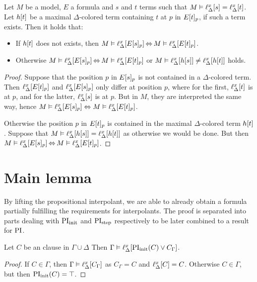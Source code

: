 \begin{lemma}
	\label{aga5tg5ba}
	Let $M$ be a model, $E$ a formula and $s$ and $t$ terms such that
	$M \vDash \ell_{\Delta}^{x}[s] = \ell_{\Delta}^{x}[t]$.
	Let $h[t]$ be a maximal $\Delta$-colored term containing $t$ at $p$ in $E{[t]_{p}}$, if such a term exists. Then it holds that:
	\begin{itemize}
		\item If $h[t]$ does not exists, then
			$M\vDash \ell_{\Delta}^{x}[E{[s]_{p}}] \operatorname{\Leftrightarrow} M \vDash \ell_{\Delta}^{x}[E{[t]_{p}}]$.
		\item Otherwise
			$M\vDash \ell_{\Delta}^{x}[E{[s]_{p}}] \operatorname{\Leftrightarrow} M \vDash \ell_{\Delta}^{x}[E{[t]_{p}}]$
			or $M\vDash \ell_{\Delta}^{x}[h[s]] \neq \ell_{\Delta}^{x}[h[t]]$ holds.
	\end{itemize}
\end{lemma}
\begin{proof} 
	Suppose that the position $p$ in $E{[s]_{p}}$ is not contained in a $\Delta$-colored term.
	Then $\ell_{\Delta}^{x}[E{[t]_{p}}]$ and $\ell_{\Delta}^{x}[E{[s]_{p}}]$ only differ at position $p$,
	where for the first, $\ell_{\Delta}^{x}[t]$ is at $p$, and for the latter, $\ell_{\Delta}^{x}[s]$ is at $p$.
	But in $M$, they are interpreted the same way, hence $M\entails\nolinebreak \lifdelta{E\occurat{s}{p}} \spas\semiff M \entails \lifdelta{E\occurat{t}{p}}$.

	Otherwise the position $p$ in $E{[t]_{p}}$ is contained in the maximal $\Delta$-colored term $h[t]$.
	Suppose that $M\vDash \ell_{\Delta}^{x}[h[s]]  = \ell_{\Delta}^{x}[h[t]]$ as otherwise we would be done.
	But then $M \entails\nolinebreak \lifdelta{E\occurat{s}{p}} \semiff{} M\entails \lifdelta{E\occurat{t}{p}}$.
\end{proof} 


\section{Main lemma}
\label{sec:two_phase_main_lemma}

By lifting the propositional interpolant, we are able to already obtain a formula partially fulfilling the requirements for interpolants.
The proof is separated into parts dealing with $\operatorname{PI}_{\mathrm{init}}$ and $\operatorname{PI}_{\mathrm{step}}$ respectively to be later combined to a result for\nolinebreak{} $\operatorname{PI}$.

\begin{lemma}
	\label{lemma:gamma_entails_init}
	Let $C$ be an clause in $\Gamma \cup \Delta$ 
	Then $\Gamma \entails \lifdelta{\PIinit(C) \lor\nolinebreak C_\Gamma}$.
\end{lemma}
\begin{proof}
	If $C \in \Gamma$, then $\Gamma \vDash \ell_{\Delta}^{x}[C_\Gamma]$ as $C_\Gamma = C$ and $\ell_{\Delta}^{x}[C] = C$.
	Otherwise $C \in \Gamma$, but then $\PIinit(C) =\nolinebreak{} \top$.
\end{proof}



